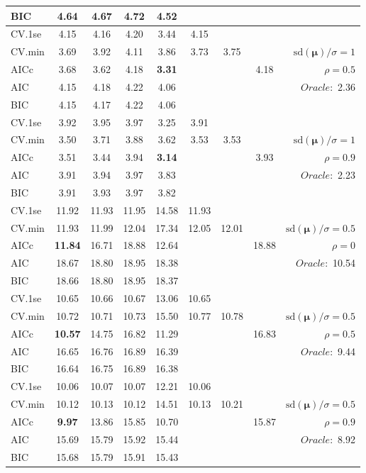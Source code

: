 \begin{table}
\begin{center}
\begin{tabular}{l*{7}{c}|r}
BIC & 4.64 & 4.67 & 4.72 & 4.52 & & & &  \\
 \hline 
CV.1se & 4.15 & 4.16 & 4.20 & 3.44 & 4.15 & & & \\
CV.min & 3.69 & 3.92 & 4.11 & 3.86 & 3.73 & 3.75 & & $\mathrm{sd}(\mathbf{\mu})/\sigma=1$ \\
AICc & 3.68 & 3.62 & 4.18 & {\bf 3.31} & & & 4.18 &  $\rho=0.5$ \\
AIC & 4.15 & 4.18 & 4.22 & 4.06 & & & &  \multirow{2}{*}{$Oracle: $ 2.36} \\
BIC & 4.15 & 4.17 & 4.22 & 4.06 & & & &  \\
 \hline 
CV.1se & 3.92 & 3.95 & 3.97 & 3.25 & 3.91 & & & \\
CV.min & 3.50 & 3.71 & 3.88 & 3.62 & 3.53 & 3.53 & & $\mathrm{sd}(\mathbf{\mu})/\sigma=1$ \\
AICc & 3.51 & 3.44 & 3.94 & {\bf 3.14} & & & 3.93 &  $\rho=0.9$ \\
AIC & 3.91 & 3.94 & 3.97 & 3.83 & & & &  \multirow{2}{*}{$Oracle: $ 2.23} \\
BIC & 3.91 & 3.93 & 3.97 & 3.82 & & & &  \\
 \hline 
CV.1se & 11.92 & 11.93 & 11.95 & 14.58 & 11.93 & & & \\
CV.min & 11.93 & 11.99 & 12.04 & 17.34 & 12.05 & 12.01 & & $\mathrm{sd}(\mathbf{\mu})/\sigma=0.5$ \\
AICc & {\bf 11.84} & 16.71 & 18.88 & 12.64 & & & 18.88 &  $\rho=0$ \\
AIC & 18.67 & 18.80 & 18.95 & 18.38 & & & &  \multirow{2}{*}{$Oracle: $ 10.54} \\
BIC & 18.66 & 18.80 & 18.95 & 18.37 & & & &  \\
 \hline 
CV.1se & 10.65 & 10.66 & 10.67 & 13.06 & 10.65 & & & \\
CV.min & 10.72 & 10.71 & 10.73 & 15.50 & 10.77 & 10.78 & & $\mathrm{sd}(\mathbf{\mu})/\sigma=0.5$ \\
AICc & {\bf 10.57} & 14.75 & 16.82 & 11.29 & & & 16.83 &  $\rho=0.5$ \\
AIC & 16.65 & 16.76 & 16.89 & 16.39 & & & &  \multirow{2}{*}{$Oracle: $ 9.44} \\
BIC & 16.64 & 16.75 & 16.89 & 16.38 & & & &  \\
 \hline 
CV.1se & 10.06 & 10.07 & 10.07 & 12.21 & 10.06 & & & \\
CV.min & 10.12 & 10.13 & 10.12 & 14.51 & 10.13 & 10.21 & & $\mathrm{sd}(\mathbf{\mu})/\sigma=0.5$ \\
AICc & {\bf 9.97} & 13.86 & 15.85 & 10.70 & & & 15.87 &  $\rho=0.9$ \\
AIC & 15.69 & 15.79 & 15.92 & 15.44 & & & &  \multirow{2}{*}{$Oracle: $ 8.92} \\
BIC & 15.68 & 15.79 & 15.91 & 15.43 & & & &  \\
 \hline 
\end{tabular}
\end{center}
\vspace{-1cm}
\end{table}




